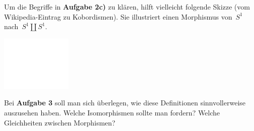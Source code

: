 \documentclass{uebblatt}
\begin{document}
Um die Begriffe in \textbf{Aufgabe 2c)} zu klären, hilft vielleicht folgende
Skizze (vom Wikipedia-Eintrag zu Kobordismen). Sie illustriert einen Morphismus
von~$S^1$ nach~$S^1 \amalg S^1$.
\begin{center}
  \includegraphics{images/pair-of-pants}
\end{center}

Bei \textbf{Aufgabe 3} soll man sich überlegen, wie diese Definitionen
sinnvollerweise auszusehen haben. Welche Isomorphismen sollte man fordern?
Welche Gleichheiten zwischen Morphismen?
\end{document}
